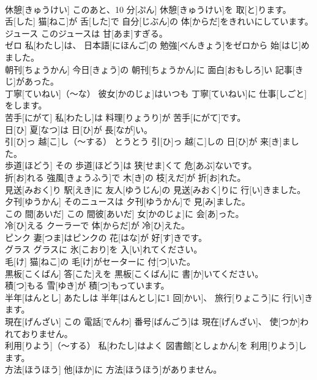 \documentclass[8pt]{extreport}
\begin{document}
\begin{CJK}{UTF8}{min}
\\	休憩[きゅうけい]	このあと、10 分[ぷん] 休憩[きゅうけい]を 取[と]ります。		
\\	舌[した]	猫[ねこ]が 舌[した]で 自分[じぶん]の 体[からだ]をきれいにしています。		
\\	ジュース	このジュースは 甘[あま]すぎる。		
\\	ゼロ	私[わたし]は、 日本語[にほんご]の 勉強[べんきょう]をゼロから 始[はじ]めました。		
\\	朝刊[ちょうかん]	今日[きょう]の 朝刊[ちょうかん]に 面白[おもしろ]い 記事[きじ]があった。		
\\	丁寧[ていねい]（～な）	彼女[かのじょ]はいつも 丁寧[ていねい]に 仕事[しごと]をします。		
\\	苦手[にがて]	私[わたし]は 料理[りょうり]が 苦手[にがて]です。		
\\	日[ひ]	夏[なつ]は 日[ひ]が 長[なが]い。		
\\	引[ひ]っ 越[こ]し（～する）	とうとう 引[ひ]っ 越[こ]しの 日[ひ]が 来[き]ました。		
\\	歩道[ほどう]	その 歩道[ほどう]は 狭[せま]くて 危[あぶ]ないです。		
\\	折[お]れる	強風[きょうふう]で 木[き]の 枝[えだ]が 折[お]れた。		
\\	見送[みおく]り	駅[えき]に 友人[ゆうじん]の 見送[みおく]りに 行[い]きました。		
\\	夕刊[ゆうかん]	そのニュースは 夕刊[ゆうかん]で 見[み]ました。		
\\	この 間[あいだ]	この 間彼[あいだ] 女[かのじょ]に 会[あ]った。		
\\	冷[ひ]える	クーラーで 体[からだ]が 冷[ひ]えた。		
\\	ピンク	妻[つま]はピンクの 花[はな]が 好[す]きです。		
\\	グラス	グラスに 氷[こおり]を 入[い]れてください。		
\\	毛[け]	猫[ねこ]の 毛[け]がセーターに 付[つ]いた。		
\\	黒板[こくばん]	答[こた]えを 黒板[こくばん]に 書[か]いてください。		
\\	積[つ]もる	雪[ゆき]が 積[つ]もっています。		
\\	半年[はんとし]	あたしは 半年[はんとし]に1 回[かい]、 旅行[りょこう]に 行[い]きます。		
\\	現在[げんざい]	この 電話[でんわ] 番号[ばんごう]は 現在[げんざい]、 使[つか]われておりません。		
\\	利用[りよう]（～する）	私[わたし]はよく 図書館[としょかん]を 利用[りよう]します。		
\\	方法[ほうほう]	他[ほか]に 方法[ほうほう]がありません。		

\end{CJK}
\end{document}
